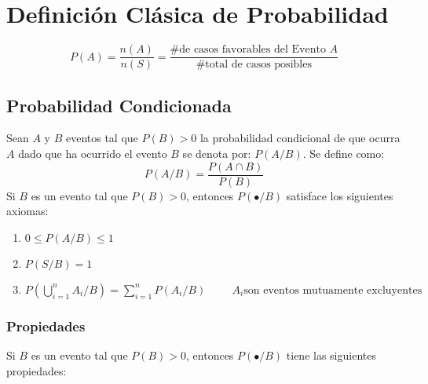\section{Definición Clásica de Probabilidad}
$$P(A)=\dfrac{n(A)}{n(S)}=\dfrac{\textrm{\# de casos favorables del Evento $A$}}{\textrm{\# total de casos posibles}}$$
\subsection{Probabilidad Condicionada}
Sean $A$ y $B$ eventos tal que $P(B)>0$ la probabilidad condicional de que ocurra $A$ dado que ha ocurrido el evento $B$ se denota por: $P(A/B)$. Se define como:
$$P(A/B)=\dfrac{P(A\cap B)}{P(B)}$$
Si $B$ es un evento tal que $P(B)>0$, entonces $P(\bullet/B)$ satisface los siguientes axiomas:
\begin{enumerate}[label=(\roman*)]
\item $0\leq P(A/B)\leq 1$
\item $P(S/B)=1$
\item $P\left( \bigcup\limits_{i=1}^{n} A_i/B\right)=
\displaystyle\sum_{i=1}^{n}P(A_i/B) \hspace{1cm}A_i \textrm{son eventos mutuamente excluyentes}$
\end{enumerate}
\subsubsection{Propiedades}
Si $B$ es un evento tal que $P(B)>0$, entonces $P(\bullet/B)$ tiene las siguientes propiedades:
